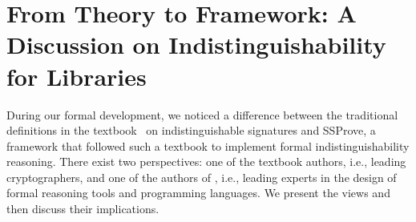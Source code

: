 \section{From Theory to Framework: A Discussion on Indistinguishability for Libraries}
\label{sec:imply}
%
%
During our formal development, we noticed a difference between the traditional definitions in the textbook~\cite{joy}
on indistinguishable signatures and SSProve, a framework 
that followed such a textbook to implement formal indistinguishability reasoning. 
%
There exist two perspectives: one of the textbook authors, 
i.e., leading cryptographers, and one of the authors of
\ssprove, i.e., leading experts in the design of formal
reasoning tools and programming languages.
%
We present the views and then discuss their implications.
%

